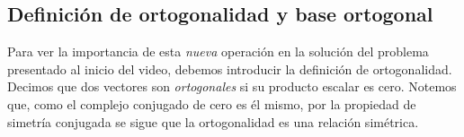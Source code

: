 \documentclass[12pt,dvipsnames]{article}
\numberwithin{equation}{section}
\begin{document}
%

\subsection{Definición de ortogonalidad y base ortogonal}

Para ver la importancia de esta \emph{nueva} operación en la solución del problema presentado al inicio del video, debemos introducir la definición de ortogonalidad. Decimos que dos vectores son \emph{ortogonales} si su producto escalar es cero. Notemos que, como el complejo conjugado de cero es él mismo, por la propiedad de simetría conjugada se sigue que la ortogonalidad es una relación simétrica.
\end{document}
